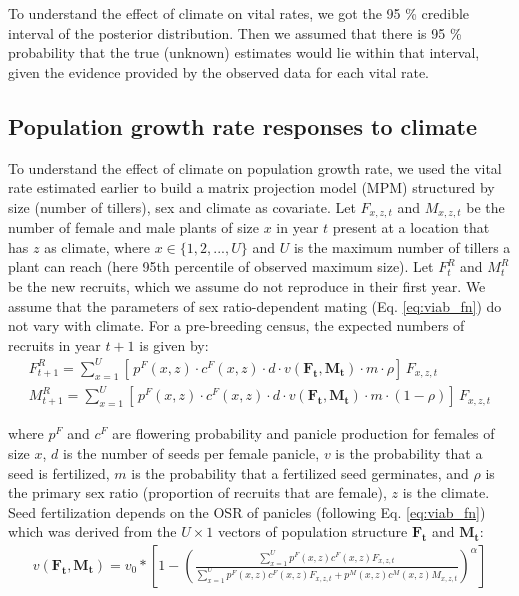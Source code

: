 \documentclass[11pt]{article}
\begin{document}
To understand the effect of climate on vital rates, we got the 95 \% credible interval of the posterior distribution.  
Then we assumed that there is 95 \% probability that the true (unknown) estimates would lie within that interval, given the evidence provided by the observed data for each vital rate.

\subsection*{Population growth rate responses to climate}
To understand the effect of climate on population growth rate, we used the vital rate estimated earlier to build a matrix projection model (MPM) structured by size (number of tillers), sex and climate as covariate.  
Let $F_{x,z,t}$ and $M_{x,z,t}$ be the number of female and male plants of size $x$ in year $t$ present at a location that has $z$ as climate, where $x \in \{1,2,...,U\}$ and $U$ is the maximum number of tillers a plant can reach (here 95th percentile of observed maximum size).
Let $F^{R}_{t}$ and $M^{R}_{t}$ be the new recruits, which we assume do not reproduce in their first year.
We assume that the parameters of sex ratio-dependent mating (Eq. \ref{eq:viab_fn}) do not vary with climate.  
For a pre-breeding census, the expected numbers of recruits in year $t+1$ is given by:
\begin{align}\label{eq:recruits}
F^{R}_{t+1} = \sum_{x=1}^{U} 	[ \, p^{F}(x,z) \cdot c^{F}(x,z) \cdot d \cdot v(\mathbf{F_{t}},\mathbf{M_{t}}) \cdot m \cdot \rho 	] \, F_{x,z,t}
\\
M^{R}_{t+1} = \sum_{x=1}^{U} 	[ \, p^{F}(x,z) \cdot c^{F}(x,z) \cdot d \cdot v(\mathbf{F_{t}},\mathbf{M_{t}}) \cdot m \cdot (1-\rho) 	] \, F_{x,z,t}
\end{align}

\noindent where $p^{F}$ and $c^{F}$ are flowering probability and panicle production for females of size $x$, $d$ is the number of seeds per female panicle, $v$ is the probability that a seed is fertilized, $m$ is the probability that a fertilized seed germinates, and $\rho$ is the primary sex ratio (proportion of recruits that are female), $z$ is the climate. 
Seed fertilization depends on the OSR of panicles (following Eq. \ref{eq:viab_fn}) which was derived from the $U \times 1$ vectors of population structure $\mathbf{F_{t}}$ and $\mathbf{M_{t}}$:
\begin{align}\label{eq:viab_MPM}
v(\mathbf{F_{t}},\mathbf{M_{t}}) = v_{0} * \left[ 1 - \left( \frac{\sum_{x=1}^{U} p^{F}(x,z) c^{F}(x,z) F_{x,z,t}}{\sum_{x=1}^{U} p^{F}(x,z) c^{F}(x,z) F_{x,z,t} + p^{M}(x,z) c^{M}(x,z) M_{x,z,t}} \right) ^{\alpha}\right]
\end{align}
\end{document}
